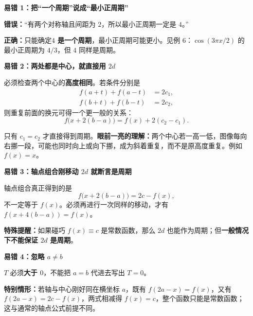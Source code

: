 \clearpage
\begin{trapbox}
\textbf{\textcolor{CTrap}{易错 1：把“一个周期”说成“最小正周期”}}



\textbf{错误：}“有两个对称轴且间距为 $2$，所以最小正周期一定是 $4$。”

\textbf{正确：}只能确定\textbf{$4$ 是一个周期}，最小正周期可能更小。见例 6：$\cos(3\pi x/2)$ 的最小正周期为 $4/3$，但 $4$ 同样是周期。

\medskip

\end{trapbox}
\clearpage
\begin{trapbox}
\textbf{\textcolor{CTrap}{易错 2：两处都是中心，就直接用 $2d$}}



必须检查两个中心的\textbf{高度相同}。若条件分别是
\[
\begin{aligned}
 f(a+t)+f(a-t)&=2c_1,\\
 f(b+t)+f(b-t)&=2c_2,
\end{aligned}
\]
则重复前面的换元可得一个更一般的关系：
\[
\boxed{f\bigl(x+2(b-a)\bigr)=f(x)+2(c_2-c_1).}
\]

只有 $c_1=c_2$ 才直接得到周期。\textbf{眼前一亮的理解：}两个中心若一高一低，图像每向右挪一段，可能也同时向上或向下挪，成为斜着重复，而不是原高度重复。例如 $f(x)=x$。

\medskip

\end{trapbox}
\clearpage
\begin{trapbox}
\textbf{\textcolor{CTrap}{易错 3：轴点组合刚移动 $2d$ 就断言是周期}}



轴点组合真正得到的是
\[
 f\bigl(x+2(b-a)\bigr)=2c-f(x),
\]
不一定等于 $f(x)$。必须再进行一次同样的移动，才有
$f(x+4(b-a))=f(x)$。

\textbf{特殊提醒：}如果碰巧 $f(x)\equiv c$ 是常数函数，那么 $2d$ 也能作为周期；但\textbf{一般情况下不能保证 $2d$ 是周期}。

\medskip

\end{trapbox}
\clearpage
\begin{trapbox}
\textbf{\textcolor{CTrap}{易错 4：忽略 $a\neq b$}}



$T$ 必须\textbf{大于 $0$}，不能把 $a=b$ 代进去写出 $T=0$。

\textbf{特别情形：}若轴与中心刚好同在横坐标 $a$，既有 $f(2a-x)=f(x)$，又有 $f(2a-x)=2c-f(x)$，两式相减得 $f(x)=c$，整个函数只能是常数函数；这与通常的轴点公式前提不同。

\medskip

\end{trapbox}
